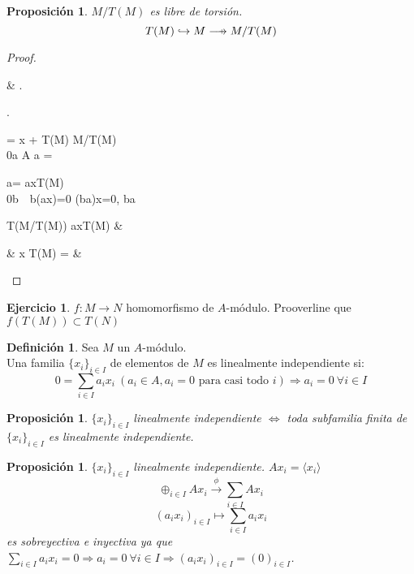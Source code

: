 \documentclass{article}
\def\flechaSobreyectiva{\mathrel{\mkern16mu  \vcenter{\hbox{$\scriptscriptstyle+$}}%
		\mkern-25mu{\longrightarrow}}}
\newenvironment{rcases}
{\left.\begin{aligned}}
	{\end{aligned}\right\rbrace}
\theoremstyle{theorem-style}  %
\newtheorem{proposition}[theorem]{Proposición}
\theoremstyle{definition}
\newtheorem{definition}{Definición}[section]
\theoremstyle{example-style}
\newtheorem{exercise}{Ejercicio}[section]
\begin{document}
	\begin{proposition}
		$M/T(M)$ es libre de torsión.
		\[  T(M) \hookrightarrow M \flechaSobreyectiva M/T(M)  \]
	\end{proposition}

	\begin{proof}
		\begin{flalign*}
		& \begin{rcases}
			\begin{rcases}
			 = x + T(M) \in M/T(M) \\
			0\neq a \in A \quad a \cdot {} = 
			\end{rcases}\Rightarrow
		 a\cdot{}=  \Leftrightarrow ax\in T(M) \\
		 0\neq b\ \  b(ax)=0 \Leftrightarrow (ba)x=0, ba
 		\end{rcases}
			\Rightarrow {} \in T(M/T(M)) \Leftrightarrow ax\in T(M) &
		\end{flalign*}
		\begin{flalign*}
		& \Leftrightarrow  x \in T(M) \Leftrightarrow {}=\overline{0} &
		\end{flalign*}
	\end{proof}

	\begin{exercise}
		$f: M \longrightarrow N$ homomorfismo de $ A $-módulo. Prooverline que $ f(T(M)) \subset T(N) $
	\end{exercise}
	\begin{definition}
		Sea $ M $ un $ A $-módulo.\\
		Una familia $ \{x_i\}_{i\in I} $ de elementos de $ M $ es linealmente independiente si:
		\[0=\sum_{i\in I}a_i x_i \  (a_i \in A, a_i =0 \text{ para casi todo }i) \Rightarrow a_i =0 \ \forall i\in I \]
	\end{definition}
	\begin{proposition}
		$ \{x_i\}_{i\in I} $ linealmente independiente $ \Leftrightarrow $ toda subfamilia finita de $ \{x_i\}_{i\in I} $ es linealmente independiente.
	\end{proposition}
	\begin{proposition}\label{prop:suma=sumadirecta}
		$ \{x_i\}_{i\in I} $ linealmente independiente.
			$ Ax_i = \langle x_i\rangle$
			\[ \oplus_{i\in I}Ax_i \xrightarrow{\ \phi\ } \sum_{i\in I} A x_i \]
			\[ (a_i x_i)_{i\in I} \longmapsto \sum_{i\in I}a_i x_i \]  es sobreyectiva e inyectiva ya que $\sum_{i\in I}a_i x_i=0\Rightarrow a_i=0 \ \forall i\in I\Rightarrow (a_i x_i)_{i\in I} = (0)_{i\in I}$.
	\end{proposition}
\end{document}
